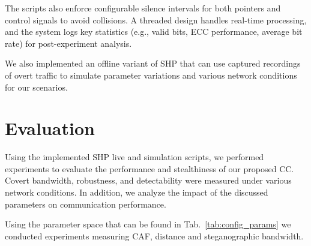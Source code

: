 \documentclass[journal]{IEEEtran}
\begin{document}
The scripts also enforce configurable silence intervals for both pointers and control signals to avoid collisions. A threaded design handles real-time processing, and the system logs key statistics (e.g., valid bits, ECC performance, average bit rate) for post-experiment analysis.

We also implemented an offline variant of \ac{SHP} that can use captured recordings of overt traffic to simulate parameter variations and various network conditions for our scenarios.

\section{Evaluation}
\label{sec:evaluation}
Using the implemented \ac{SHP} live and simulation scripts, we performed experiments to evaluate the performance and stealthiness of our proposed \ac{CC}. Covert bandwidth, robustness, and detectability were measured under various network conditions. In addition, we analyze the impact of the discussed parameters on communication performance.

Using the parameter space that can be found in Tab.~\ref{tab:config_params} we conducted experiments measuring \ac{CAF}, distance and steganographic bandwidth.

\begin{table}[t]
\centering
\caption{Configuration Parameters and their used values}
\label{tab:config_params}
\end{table}
\end{document}
